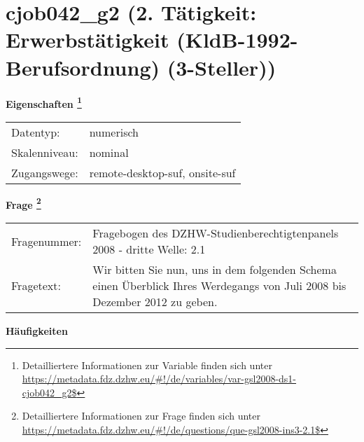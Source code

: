 
    \setcounter{footnote}{0}

    \vspace*{-1.8cm}
	\section{cjob042\_g2 (2. Tätigkeit: Erwerbstätigkeit (KldB-1992-Berufsordnung) (3-Steller))}
	\label{section:cjob042_g2}



    \vspace*{0.5cm}
    \noindent\textbf{Eigenschaften
	\footnote{Detailliertere Informationen zur Variable finden sich unter
		\url{https://metadata.fdz.dzhw.eu/\#!/de/variables/var-gsl2008-ds1-cjob042_g2$}}}\\
	\begin{tabularx}{\hsize}{@{}lX}
	Datentyp: & numerisch \\
	Skalenniveau: & nominal \\
	Zugangswege: &
	  remote-desktop-suf, 
	  onsite-suf
 \\
    \end{tabularx}



				\vspace*{0.5cm}
                \noindent\textbf{Frage
	                \footnote{Detailliertere Informationen zur Frage finden sich unter
		              \url{https://metadata.fdz.dzhw.eu/\#!/de/questions/que-gsl2008-ins3-2.1$}}}\\
				\begin{tabularx}{\hsize}{@{}lX}
					Fragenummer: &
					  Fragebogen des DZHW-Studienberechtigtenpanels 2008 - dritte Welle:
					  2.1
 \\
					Fragetext: & Wir bitten Sie nun, uns in dem folgenden Schema einen Überblick Ihres Werdegangs von Juli 2008 bis Dezember 2012 zu geben. \\
				\end{tabularx}





        		\vspace*{0.5cm}
                \noindent\textbf{Häufigkeiten}

